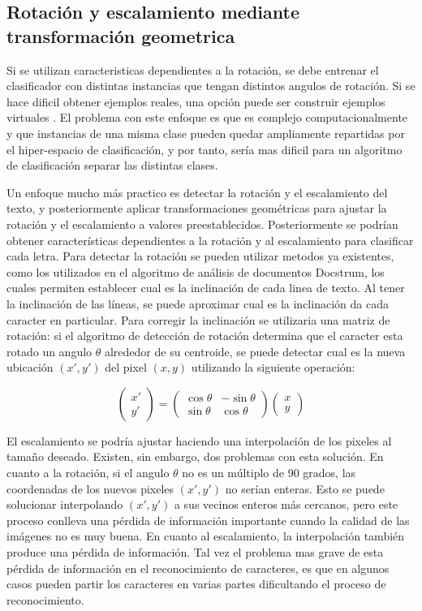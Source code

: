 \documentclass[a4paper, 11pt, oneside]{report}
\begin{document}
\subsection{Rotación y escalamiento mediante transformación geometrica}

Si se utilizan caracteristicas dependientes a la rotación, se debe entrenar el clasificador con distintas instancias que tengan distintos angulos de rotación. Si se hace dificil obtener ejemplos reales, una opción puede ser construir ejemplos virtuales \cite{niyogi2002}. El problema con este enfoque es que es complejo computacionalmente y que instancias de una misma clase pueden quedar ampliamente repartidas por el hiper-espacio de clasificación, y por tanto, sería mas dificil para un algoritmo de clasificación separar las distintas clases.

Un enfoque mucho más practico es detectar la rotación y el escalamiento del texto, y posteriormente aplicar transformaciones geométricas para ajustar la rotación y el escalamiento a valores preestablecidos. Posteriormente se podrían obtener características dependientes a la rotación y al escalamiento para clasificar cada letra. Para detectar la rotación se pueden utilizar metodos ya existentes, como los utilizados en el algoritmo de análisis de documentos Docstrum, los cuales permiten establecer cual es la inclinación de cada linea de texto. Al tener la inclinación de las líneas, se puede aproximar cual es la inclinación da cada caracter en particular. Para corregir la inclinación se utilizaria una matriz de rotación: si el algoritmo de detección de rotación determina que el caracter esta rotado un angulo $\theta$ alrededor de su centroide, se puede detectar cual es la nueva ubicación $(x', y')$ del pixel $(x, y)$ utilizando la siguiente operación:

	\[
		\begin{pmatrix} 
			x' \\ y'
		\end{pmatrix}
		=
		\begin{pmatrix} 
			\cos\theta & -\sin\theta \\
			\sin\theta & \cos\theta
		\end{pmatrix}
		\begin{pmatrix} 
			x \\ y
		\end{pmatrix}
	\]

El escalamiento se podría ajustar haciendo una interpolación de los pixeles al tamaño deseado. Existen, sin embargo, dos problemas con esta solución. En cuanto a la rotación, si el angulo $\theta$ no es un múltiplo de 90 grados, las coordenadas de los nuevos pixeles $(x', y')$ no serían enteras. Esto se puede solucionar interpolando $(x',y')$ a sus vecinos enteros más cercanos, pero este proceso conlleva una pérdida de información importante cuando la calidad de las imágenes no es muy buena. En cuanto al escalamiento, la interpolación también produce una pérdida de información. Tal vez el problema mas grave de esta pérdida de información en el reconocimiento de caracteres, es que en algunos casos pueden partir los caracteres en varias partes dificultando el proceso de reconocimiento.
\end{document}

